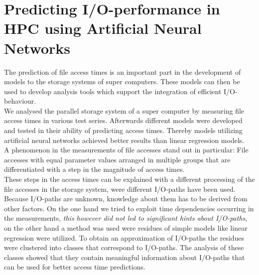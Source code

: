 \documentclass[11pt]{scrartcl}
\begin{document}
\section*{{\large Predicting I/O-performance in HPC using Artificial Neural Networks}}

The prediction of file access times is an important part in the development of models to the storage systems of super computers.
These models can then be used to develop analysis tools which support the integration of efficient I/O-behaviour.\\
We analysed the parallel storage system of a super computer by measuring file access times in various test series.
Afterwards different models were developed and tested in their ability of predicting access times.
Thereby models utilizing artificial neural networks achieved better results than linear regression models.\\
A phenomenon in the measurements of file accesses stand out in particular: File accesses with equal parameter values arranged in multiple groups that are differentiated with a step in the magnitude of access times.\\
These steps in the access times can be explained with a different processing of the file accesses in the storage system, were different I/O-paths have been used.
Because I/O-paths are unknown, knowledge about them has to be derived from other factors.
On the one hand we tried to exploit time dependencies occurring in the measurements, \textit{this however did not led to significant hints about I/O-paths}, on the other hand a method was used were residues of simple models like linear regression were utilized.
To obtain an approximation of I/O-paths the residues were clustered into classes that correspond to I/O-paths.
The analysis of these classes showed that they contain meaningful information about I/O-paths that can be used for better access time predictions.
\end{document}
